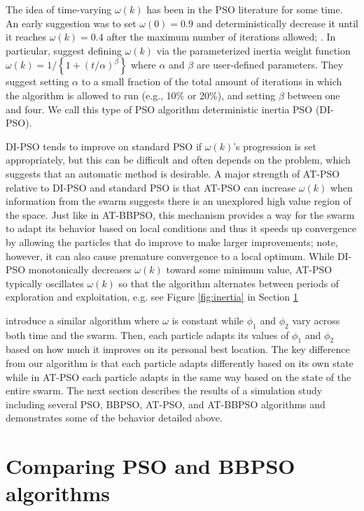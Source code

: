 \documentclass[cmbright]{staauth}
\begin{document}
The idea of time-varying $\omega(k)$ has been in the PSO literature for some time. An early suggestion was to set $\omega(0)=0.9$ and deterministically decrease it until it reaches $\omega(k)=0.4$ after the maximum number of iterations allowed; \cite{eberhart2000comparing}. In particular, \cite{tuppadung2011comparing} suggest defining $\omega(k)$ via the parameterized inertia weight function $\omega(k) = 1/\left\{1 + (t/\alpha)^{\beta}\right\}$ where $\alpha$ and $\beta$ are user-defined parameters. They suggest setting $\alpha$ to a small fraction of the total amount of iterations in which the algorithm is allowed to run (e.g., 10\% or 20\%), and setting $\beta$ between one and four. We call this type of PSO algorithm deterministic inertia PSO (DI-PSO).

DI-PSO tends to improve on standard PSO if $\omega(k)$'s progression is set appropriately, but this can be difficult and often depends on the problem, which suggests that an automatic method is desirable. A major strength of AT-PSO relative to DI-PSO and standard PSO is that AT-PSO can increase $\omega(k)$ when information from the swarm suggests there is an unexplored high value region of the space. Just like in AT-BBPSO, this mechanism provides a way for the swarm to adapt its behavior based on local conditions and thus it speeds up convergence by allowing the particles that do improve to make larger improvements; note, however, it can also cause premature convergence to a local optimum. While DI-PSO monotonically decreases $\omega(k)$ toward some minimum value, AT-PSO typically oscillates $\omega(k)$ so that the algorithm alternates between periods of exploration and exploitation, e.g. see Figure \ref{fig:inertia} in Section \ref{sec:psocompare}

\cite{zhang2003adaptive} introduce a similar algorithm where $\omega$ is constant while $\phi_1$ and $\phi_2$ vary across both time and the swarm. Then, each particle adapts its values of $\phi_1$ and $\phi_2$ based on how much it improves on its personal best location. The key difference from our algorithm is that each particle adapts differently based on its own state while in AT-PSO each particle adapts in the same way based on the state of the entire swarm. The next section describes the results of a simulation study including several PSO, BBPSO, AT-PSO, and AT-BBPSO algorithms and demonstrates some of the behavior detailed above.


\section{Comparing PSO and BBPSO algorithms}\label{sec:psocompare}
\end{document}
